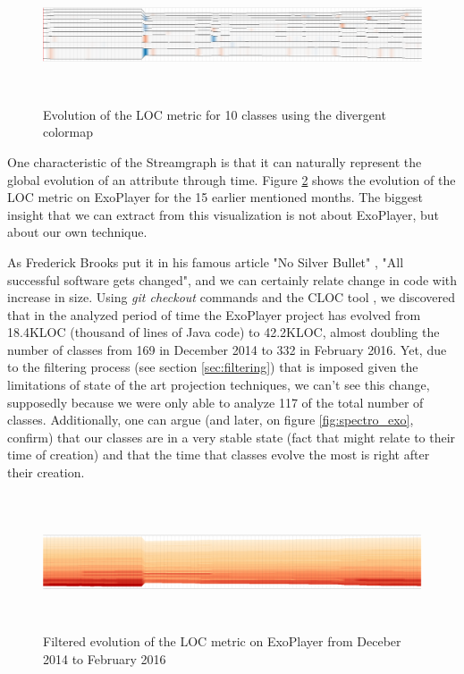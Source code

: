 \begin{figure}[H]
	\centering
	\includegraphics[width=1.0\textwidth,height=4.0cm]{figures/stream_10_loc_div.png}
	\caption{Evolution of the LOC metric for 10 classes using the divergent colormap}
	\label{fig:stream_10_loc_div}
\end{figure}

One characteristic of the Streamgraph is that it can naturally represent the global evolution of an attribute through time. Figure \ref{fig:stream_all_loc} shows the evolution of the LOC metric on ExoPlayer for the 15 earlier mentioned months. The biggest insight that we can extract from this visualization is not about ExoPlayer, but about our own technique.

As Frederick Brooks put it in his famous article "No Silver Bullet" \cite{brooks1987}, "All successful software gets changed", and we can certainly relate change in code with increase in size. Using \textit{git checkout} commands and the CLOC tool \cite{ref:cloc}
, we discovered that in the analyzed period of time the ExoPlayer project has evolved from 18.4KLOC (thousand of lines of Java code) to 42.2KLOC, almost doubling the number of classes from 169 in December 2014 to 332 in February 2016. Yet, due to the filtering process (see section \ref{sec:filtering}) that is imposed given the limitations of state of the art projection techniques, we can't see this change, supposedly because we were only able to analyze 117 of the total number of classes. Additionally, one can argue (and later, on figure \ref{fig:spectro_exo}, confirm) that our classes are in a very stable state (fact that might relate to their time of creation) and that the time that classes evolve the most is right after their creation.

\begin{figure}[H]
  \centering
  \includegraphics[width=1.0\textwidth,height=4.0cm]{figures/stream_all_loc.png}
  \caption{Filtered evolution of the LOC metric on ExoPlayer from Deceber 2014 to February 2016}
  \label{fig:stream_all_loc}
\end{figure}

